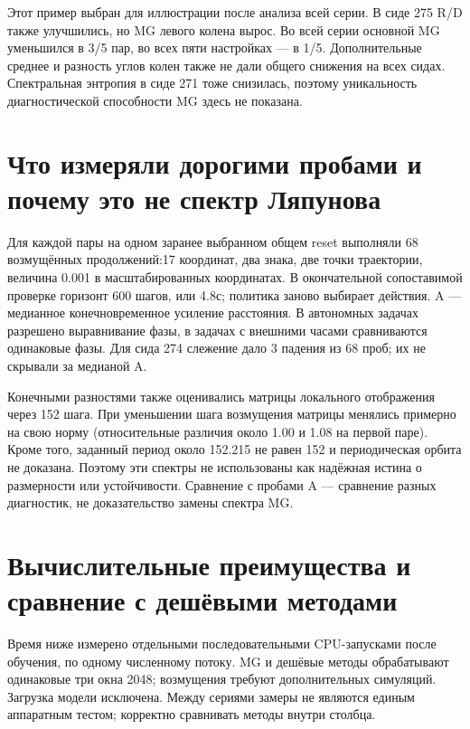 \documentclass[10pt,a4paper]{article}
\begin{document}
Этот пример выбран для иллюстрации после анализа всей серии. В сиде 275 R/D также улучшились, но MG левого колена вырос. Во всей серии основной MG уменьшился в 3/5 пар, во всех пяти настройках --- в 1/5. Дополнительные среднее и разность углов колен также не дали общего снижения на всех сидах. Спектральная энтропия в сиде 271 тоже снизилась, поэтому уникальность диагностической способности MG здесь не показана.

\section*{Что измеряли дорогими пробами и почему это не спектр Ляпунова}

Для каждой пары на одном заранее выбранном общем reset выполняли 68 возмущённых продолжений:17 координат, два знака, две точки траектории, величина 0.001 в масштабированных координатах. В окончательной сопоставимой проверке горизонт 600 шагов, или 4.8с; политика заново выбирает действия. A --- медианное конечновременное усиление расстояния. В автономных задачах разрешено выравнивание фазы, в задачах с внешними часами сравниваются одинаковые фазы. Для сида 274 слежение дало 3 падения из 68 проб; их не скрывали за медианой A.

Конечными разностями также оценивались матрицы локального отображения через 152 шага. При уменьшении шага возмущения матрицы менялись примерно на свою норму (относительные различия около 1.00 и 1.08 на первой паре). Кроме того, заданный период около 152.215 не равен 152 и периодическая орбита не доказана. Поэтому эти спектры не использованы как надёжная истина о размерности или устойчивости. Сравнение с пробами A --- сравнение разных диагностик, не доказательство замены спектра MG.

\newpage

\section*{Вычислительные преимущества и сравнение с дешёвыми методами}

Время ниже измерено отдельными последовательными CPU-запусками после обучения, по одному численному потоку. MG и дешёвые методы обрабатывают одинаковые три окна 2048; возмущения требуют дополнительных симуляций. Загрузка модели исключена. Между сериями замеры не являются единым аппаратным тестом; корректно сравнивать методы внутри столбца.
\end{document}
